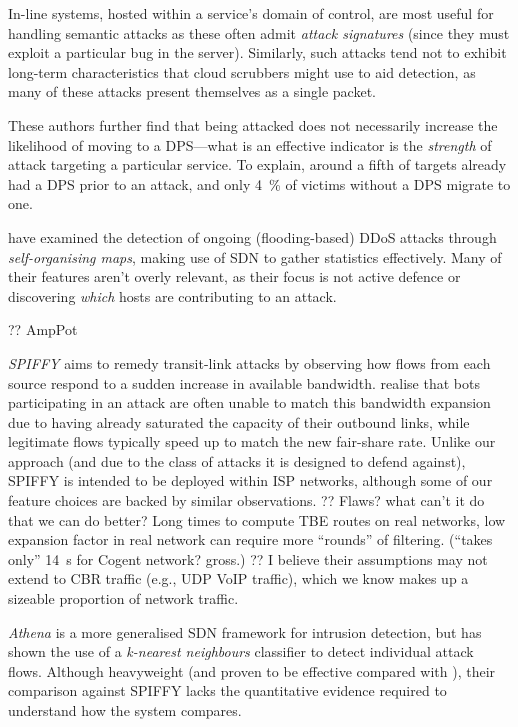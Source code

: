In-line systems, hosted within a service's domain of control, are most useful for handling semantic attacks as these often admit \emph{attack signatures} (since they must exploit a particular bug in the server).
Similarly, such attacks tend not to exhibit long-term characteristics that cloud scrubbers might use to aid detection, as many of these attacks present themselves as a single packet.

These authors further find that being attacked does not necessarily increase the likelihood of moving to a DPS---what is an effective indicator is the \emph{strength} of attack targeting a particular service.
To explain, around a fifth of targets already had a DPS prior to an attack, and only \SI{4}{\percent} of victims without a DPS migrate to one.

\Textcite{DBLP:conf/lcn/BragaMP10} have examined the detection of ongoing (flooding-based) DDoS attacks through \emph{self-organising maps}, making use of SDN to gather statistics effectively.
Many of their features aren't overly relevant, as their focus is not active defence or discovering \emph{which} hosts are contributing to an attack.

?? AmpPot \cite{DBLP:conf/raid/KramerKMNKYR15}

\emph{SPIFFY} \cite{DBLP:conf/ndss/KangGS16} aims to remedy transit-link attacks by observing how flows from each source respond to a sudden increase in available bandwidth.
 realise that bots participating in an attack are often unable to match this bandwidth expansion due to having already saturated the capacity of their outbound links, while legitimate flows typically speed up to match the new fair-share rate.
Unlike our approach (and due to the class of attacks it is designed to defend against), SPIFFY is intended to be deployed within ISP networks, although some of our feature choices are backed by similar observations.
?? Flaws? what can't it do that we can do better? Long times to compute TBE routes on real networks, low expansion factor in real network can require more ``rounds'' of filtering. (``takes only'' \SI{14}{\second} for Cogent network? gross.)
?? I believe their assumptions may not extend to CBR traffic (e.g., UDP VoIP traffic), which we know makes up a sizeable proportion of network traffic.

\emph{Athena} \cite{DBLP:conf/dsn/LeeKSPY17} is a more generalised SDN framework for intrusion detection, but has shown the use of a \emph{k-nearest neighbours} classifier to detect individual attack flows.
Although heavyweight (and proven to be effective compared with \textcite{DBLP:conf/lcn/BragaMP10}), their comparison against SPIFFY lacks the quantitative evidence required to understand how the system compares.

